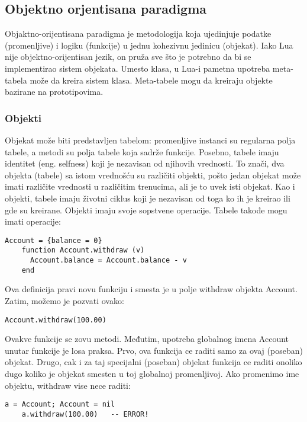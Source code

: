 \documentclass[a4paper]{article}
\begin{document}
\subsection*{Objektno orjentisana paradigma}

Objaktno-orijentisana paradigma je metodologija koja ujedinjuje podatke (promenljive) i logiku (funkcije) u jednu kohezivnu jedinicu (objekat). Iako Lua nije objektno-orijentisan jezik, on pruža sve što je potrebno da bi se implementirao sistem objekata. Umesto klasa, u Lua-i pametna upotreba meta-tabela može da kreira sistem klasa. Meta-tabele mogu da kreiraju objekte bazirane na prototipovima.

\subsubsection*{Objekti}
Objekat može biti predstavljen tabelom: promenljive instanci su regularna polja tabele, a metodi su polja tabele koja sadrže funkcije. Posebno, tabele imaju identitet (eng. selfness) koji je nezavisan od njihovih vrednosti. To znači, dva objekta (tabele) sa istom vrednošću su različiti objekti, pošto jedan objekat može imati različite vrednosti u različitim trenucima, ali je to uvek isti objekat. Kao i objekti, tabele imaju životni ciklus koji je nezavisan od toga ko ih je kreirao ili gde su kreirane.
Objekti imaju svoje sopstvene operacije. Tabele takođe mogu imati operacije:
\begin{lstlisting}[caption={OOP},frame=single, label=oop1]
    Account = {balance = 0}
    function Account.withdraw (v)
      Account.balance = Account.balance - v
    end
\end{lstlisting}
Ova definicija pravi novu funkciju i smesta je u polje withdraw objekta Account. Zatim, možemo je pozvati ovako:
\begin{lstlisting}[caption={OOP},frame=single, label=oop2]
    Account.withdraw(100.00)
\end{lstlisting}

Ovakve funkcije se zovu metodi. Međutim, upotreba globalnog imena Account unutar funkcije je losa praksa. Prvo, ova funkcija ce raditi samo za ovaj (poseban) objekat. Drugo, cak i za taj specijalni (poseban) objekat funkcija ce raditi onoliko dugo koliko je objekat smesten u toj globalnoj promenljivoj. Ako promenimo ime objektu, withdraw vise nece raditi:
\begin{lstlisting}[caption={OOP},frame=single, label=oop3]
    a = Account; Account = nil
    a.withdraw(100.00)   -- ERROR!
\end{lstlisting}
\end{document}
